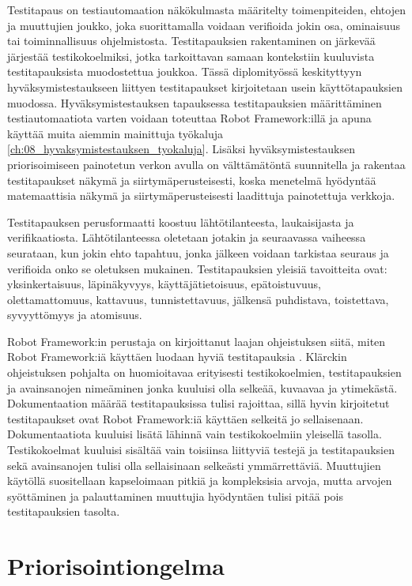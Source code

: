   Testitapaus on testiautomaation näkökulmasta määritelty toimenpiteiden, ehtojen ja muuttujien joukko, joka suorittamalla voidaan verifioida jokin osa, ominaisuus tai toiminnallisuus ohjelmistosta.
  Testitapauksien rakentaminen on järkevää järjestää testikokoelmiksi, jotka tarkoittavan samaan kontekstiin kuuluvista testitapauksista muodostettua joukkoa.
  Tässä diplomityössä keskityttyyn hyväksymistestaukseen liittyen testitapaukset kirjoitetaan usein käyttötapauksien muodossa.
  Hyväksymistestauksen tapauksessa testitapauksien määrittäminen testiautomaatiota varten voidaan toteuttaa Robot Framework:illä ja apuna käyttää muita aiemmin mainittuja työkaluja \ref{ch:08_hyvaksymistestauksen_tyokaluja}.
  Lisäksi hyväksymistestauksen priorisoimiseen painotetun verkon avulla on välttämätöntä suunnitella ja rakentaa testitapaukset näkymä ja siirtymäperusteisesti, koska menetelmä hyödyntää matemaattisia näkymä ja siirtymäperusteisesti laadittuja painotettuja verkkoja.

  Testitapauksen perusformaatti koostuu lähtötilanteesta, laukaisijasta ja verifikaatiosta.
  Lähtötilanteessa oletetaan jotakin ja seuraavassa vaiheessa seurataan, kun jokin ehto tapahtuu, jonka jälkeen voidaan tarkistaa seuraus ja verifioida onko se oletuksen mukainen.
  Testitapauksien yleisiä tavoitteita ovat: yksinkertaisuus, läpinäkyvyys, käyttäjätietoisuus, epätoistuvuus, olettamattomuus, kattavuus, tunnistettavuus, jälkensä puhdistava, toistettava, syvyyttömyys ja atomisuus. %

  Robot Framework:in perustaja on kirjoittanut laajan ohjeistuksen siitä, miten Robot Framework:iä käyttäen luodaan hyviä testitapauksia \parencite{klarck_how-to-write-good-test-cases_2019}.
  Klärckin ohjeistuksen pohjalta on huomioitavaa erityisesti testikokoelmien, testitapauksien ja avainsanojen nimeäminen jonka kuuluisi olla selkeää, kuvaavaa ja ytimekästä.
  Dokumentaation määrää testitapauksissa tulisi rajoittaa, sillä hyvin kirjoitetut testitapaukset ovat Robot Framework:iä käyttäen selkeitä jo sellaisenaan.
  Dokumentaatiota kuuluisi lisätä lähinnä vain testikokoelmiin yleisellä tasolla.
  Testikokoelmat kuuluisi sisältää vain toisiinsa liittyviä testejä ja testitapauksien sekä avainsanojen tulisi olla sellaisinaan selkeästi ymmärrettäviä.
  Muuttujien käytöllä suositellaan kapseloimaan pitkiä ja kompleksisia arvoja, mutta arvojen syöttäminen ja palauttaminen muuttujia hyödyntäen tulisi pitää pois testitapauksien tasolta.

\section{Priorisointiongelma} \label{ch:08_priorisointiongelma}

